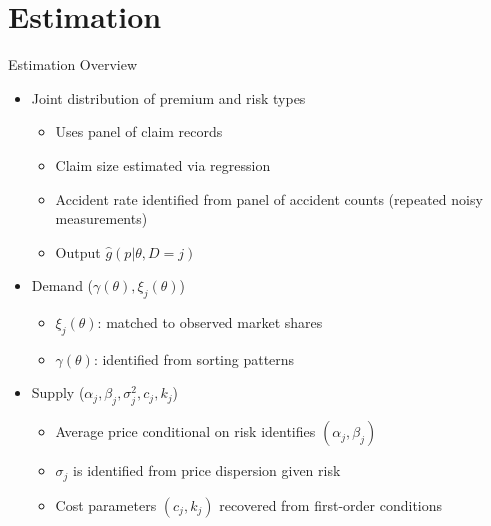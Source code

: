 \documentclass[10pt,aspectratio=169]{beamer}
\begin{document}
\section{Estimation}

\begin{frame}{Estimation Overview}\label{estimation:overview}
  \begin{itemize}
    \item Joint distribution of premium and risk types  \hyperlink{appendix:slide1}{}
    \begin{itemize}
      \item Uses panel of claim records
      \item Claim size estimated via regression
      \item Accident rate identified from panel of accident counts (repeated noisy measurements)
      \item Output   $\hat{g}(p | \theta, D=j)$
  \end{itemize}
    \item Demand ($\gamma(\theta), \xi_j(\theta)$)
    \begin{itemize}
      \item $\xi_j(\theta)$: matched to observed market shares
      \item $\gamma(\theta)$: identified from sorting patterns
    \end{itemize}
    \item Supply ($\alpha_j, \beta_j, \sigma_j^2, c_j, k_j$)
    \begin{itemize}
      \item Average price conditional on risk identifies $(\alpha_j, \beta_j)$  \hyperlink{appendix:slide3}{}
      \item $\sigma_j$ is identified from price dispersion given risk  \hyperlink{appendix:slide3.1}{}
      \item Cost parameters $(c_j, k_j)$ recovered from first-order conditions \hyperlink{appendix:slide4}{}
    \end{itemize}
  \end{itemize}
\end{frame}
\end{document}
